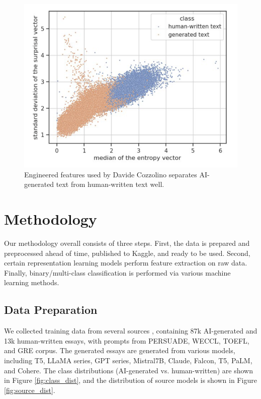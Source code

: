 \documentclass[conference]{IEEEtran}
\begin{document}
\begin{figure}[htbp]
  \centerline{\includegraphics[width=\columnwidth]{figs/cozzolino.png}}
  \caption{Engineered features used by Davide Cozzolino \cite{6thplace} separates AI-generated text from human-written text well.}
  \label{fig:cozzolino}
\end{figure}

\section{Methodology}

Our methodology overall consists of three steps. First, the data is prepared and preprocessed ahead of time, published to Kaggle, and ready to be used. Second, certain representation learning models perform feature extraction on raw data. Finally, binary/multi-class classification is performed via various machine learning methods.

\subsection{Data Preparation}

We collected training data from several sources \cite{persuade,mistral7b,argugpt,daigtv4,fpeprocessed}, containing 87k AI-generated and 13k human-written essays, with prompts from PERSUADE, WECCL, TOEFL, and GRE corpus. The generated essays are generated from various models, including T5, LLaMA series, GPT series, Mistral7B, Claude, Falcon, T5, PaLM, and Cohere. The class distributions (AI-generated vs. human-written) are shown in Figure \ref{fig:class_dist}, and the distribution of source models is shown in Figure \ref{fig:source_dist}.
\end{document}
